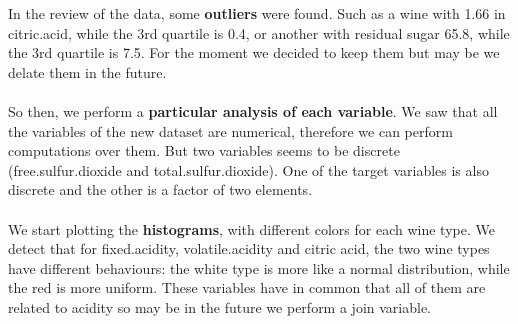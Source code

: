 \documentclass[10pt]{article}
\begin{document}
In the review of the data, some \textbf{outliers} were found. Such as a wine with 1.66 in citric.acid, while the 3rd quartile is 0.4, or another with residual sugar 65.8, while the 3rd quartile is 7.5. For the moment we decided to keep them but may be we delate them in the future. \\ \ \\
So then, we perform a \textbf{particular analysis of each variable}. We saw that all the variables of the new dataset are numerical, therefore we can perform computations over them. But two variables seems to be discrete (free.sulfur.dioxide and total.sulfur.dioxide). One of the target variables is also discrete and the other is a factor of two elements. \\ \ \\
We start plotting the \textbf{histograms}, with different colors for each wine type. We detect that for fixed.acidity, volatile.acidity and citric acid, the two wine types have different behaviours: the white type is more like a normal distribution, while the red is more uniform. These variables have in common that all of them are related to acidity so may be in the future we perform a join variable. \\
\end{document}
